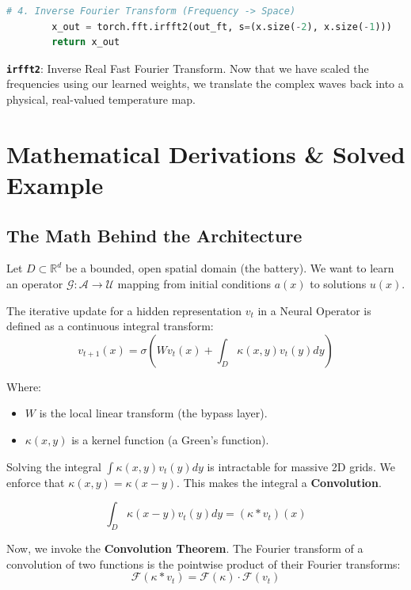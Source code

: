\documentclass[12pt,a4paper]{article}
\begin{document}
\begin{lstlisting}[language=Python]
        # 4. Inverse Fourier Transform (Frequency -> Space)
        x_out = torch.fft.irfft2(out_ft, s=(x.size(-2), x.size(-1)))
        return x_out
\end{lstlisting}
\textbf{\texttt{irfft2}}: Inverse Real Fast Fourier Transform. Now that we have scaled the frequencies using our learned weights, we translate the complex waves back into a physical, real-valued temperature map.

\section{Mathematical Derivations \& Solved Example}

\subsection{The Math Behind the Architecture}
Let $D \subset \mathbb{R}^d$ be a bounded, open spatial domain (the battery). We want to learn an operator $\mathcal{G} : \mathcal{A} \rightarrow \mathcal{U}$ mapping from initial conditions $a(x)$ to solutions $u(x)$.

The iterative update for a hidden representation $v_t$ in a Neural Operator is defined as a continuous integral transform:
\begin{equation}
v_{t+1}(x) = \sigma \left( W v_t(x) + \int_D \kappa(x, y) v_t(y) dy \right)
\end{equation}

Where:
\begin{itemize}
    \item $W$ is the local linear transform (the bypass layer).
    \item $\kappa(x, y)$ is a kernel function (a Green's function).
\end{itemize}

Solving the integral $\int \kappa(x, y) v_t(y) dy$ is intractable for massive 2D grids. We enforce that $\kappa(x, y) = \kappa(x - y)$. This makes the integral a \textbf{Convolution}.

\begin{equation}
\int_D \kappa(x - y) v_t(y) dy = (\kappa * v_t)(x)
\end{equation}

Now, we invoke the \textbf{Convolution Theorem}. The Fourier transform of a convolution of two functions is the pointwise product of their Fourier transforms:
\begin{equation}
\mathcal{F}(\kappa * v_t) = \mathcal{F}(\kappa) \cdot \mathcal{F}(v_t)
\end{equation}
\end{document}
